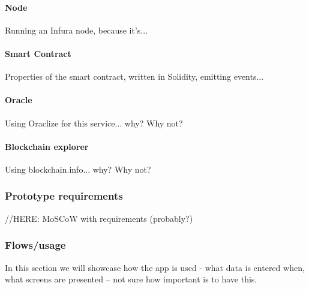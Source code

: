 \paragraph{Node}
Running an Infura node, because it's...
% 
\paragraph{Smart Contract}
Properties of the smart contract, written in Solidity, emitting events...
% 
\paragraph{Oracle}
Using Oraclize for this service... why? Why not?
% 
\paragraph{Blockchain explorer}
Using blockchain.info... why? Why not?


\subsubsection{Prototype requirements}

//HERE: MoSCoW with requirements (probably?)

\subsubsection{Flows/usage}
% 
In this section we will showcase how the app is used - what data is entered when, what screens are presented -- not sure how important is to have this.


